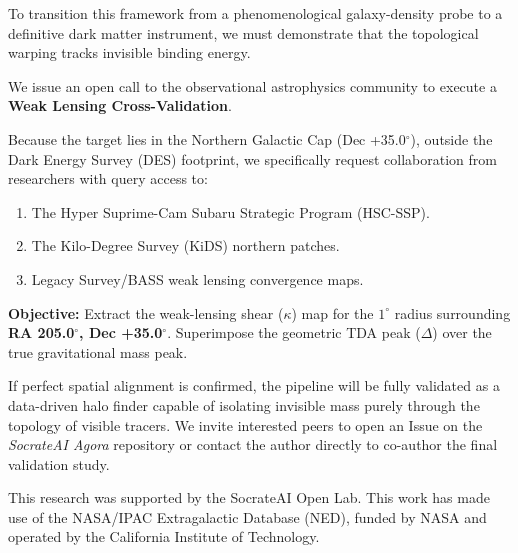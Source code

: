 \documentclass[aps,prd,twocolumn,nofootinbib,superscriptaddress,10pt]{revtex4-2}
\begin{document}
To transition this framework from a phenomenological galaxy-density probe to a definitive dark matter instrument, we must demonstrate that the topological warping tracks invisible binding energy. 

We issue an open call to the observational astrophysics community to execute a \textbf{Weak Lensing Cross-Validation}. 

Because the target lies in the Northern Galactic Cap (Dec +35.0$^\circ$), outside the Dark Energy Survey (DES) footprint, we specifically request collaboration from researchers with query access to:
\begin{enumerate}
    \item The Hyper Suprime-Cam Subaru Strategic Program (HSC-SSP).
    \item The Kilo-Degree Survey (KiDS) northern patches.
    \item Legacy Survey/BASS weak lensing convergence maps.
\end{enumerate}

\textbf{Objective:} Extract the weak-lensing shear ($\kappa$) map for the $1^\circ$ radius surrounding \textbf{RA 205.0$^\circ$, Dec +35.0$^\circ$}. Superimpose the geometric TDA peak ($\Delta$) over the true gravitational mass peak. 

If perfect spatial alignment is confirmed, the pipeline will be fully validated as a data-driven halo finder capable of isolating invisible mass purely through the topology of visible tracers. We invite interested peers to open an Issue on the \textit{SocrateAI Agora} repository or contact the author directly to co-author the final validation study.

\begin{acknowledgments}
This research was supported by the SocrateAI Open Lab. This work has made use of the NASA/IPAC Extragalactic Database (NED), funded by NASA and operated by the California Institute of Technology.
\end{acknowledgments}
\end{document}

